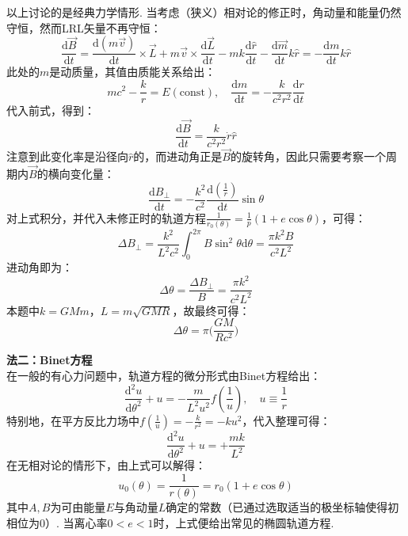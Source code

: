 \documentclass{ctexart}
\begin{document}
以上讨论的是经典力学情形. 当考虑（狭义）相对论的修正时，角动量和能量仍然守恒，然而LRL矢量不再守恒：
\begin{equation}
  \frac{\mathrm{d}\vec{B}}{\mathrm{d}t}=
  \frac{\mathrm{d}(m\vec{v})}{\mathrm{d}t}\times \vec{L}+m\vec{v}\times \frac{\mathrm{d}\vec{L}}{\mathrm{d}t}-mk\frac{\mathrm{d}\hat{r}}{\mathrm{d}t}-\frac{\mathrm{d}\vec{m}}{\mathrm{d}t}k\hat{r}
  =-\frac{\mathrm{d}m}{\mathrm{d}t}k\hat{r} \tag{7.15}
\end{equation}
此处的$m$是动质量，其值由质能关系给出：
\begin{equation}
  mc^2-\frac{k}{r}=E(\mathrm{const}),\quad \frac{\mathrm{d}m}{\mathrm{d}t}=-\frac{k}{c^2 r^2}\frac{\mathrm{d}r}{\mathrm{d}t} \tag{7.16}
\end{equation}
代入前式，得到：
\begin{equation}
  \frac{\mathrm{d}\vec{B}}{\mathrm{d}t}=\frac{k}{c^2 r^2}\dot{r}\hat{r} \tag{7.17}
\end{equation}
注意到此变化率是沿径向$\hat{r}$的，而进动角正是$\vec{B}$的旋转角，因此只需要考察一个周期内$\vec{B}$的横向变化量：
\begin{equation}
\frac{\text{d}B_\bot}{\text{d}t}=-\frac{k^2}{c^2}\frac{\text{d}(\frac{1}{r})}{\text{d}t}\sin{\theta}\tag{7.18}
\end{equation}
对上式积分，并代入未修正时的轨道方程$\displaystyle\frac{1}{r_0(\theta)}=\frac{1}{p}(1+e\cos{\theta})$，可得：
\begin{equation}
\Delta{B_\bot}=\frac{k^2}{L^2c^2}\int_0^{2\pi}B\sin^2{\theta}\text{d}\theta=\frac{{\pi}k^2B}{c^2L^2}\tag{7.19}
\end{equation}
进动角即为：
\begin{equation}
\Delta{\theta}=\frac{\Delta{B_\bot}}{B}=\frac{{\pi}k^2}{c^2L^2} \tag{7.20}
\end{equation}
本题中$k=GMm$，$L=m\sqrt{GMR}$，故最终可得：
\begin{equation}
\Delta{\theta}=\pi \Big(\frac{GM}{Rc^2}\Big) \tag{7.21}
\end{equation}

\noindent \textbf{法二：Binet方程}\\
在一般的有心力问题中，轨道方程的微分形式由Binet方程给出：
\begin{equation}
\displaystyle \frac{\text{d}^2u}{\text{d}\theta^2}+u=-\frac{m}{L^2u^2}f(\frac{1}{u}),\quad u\equiv \frac{1}{r}\tag{7.22}
\end{equation}
特别地，在平方反比力场中$\displaystyle f(\frac{1}{u})=-\frac{k}{r^2}=-ku^2$，代入整理可得：
\begin{equation}
\displaystyle \frac{\text{d}^2u}{\text{d}\theta^2}+u=+\frac{mk}{L^2} \tag{7.23}
\end{equation}
在无相对论的情形下，由上式可以解得：
\begin{equation}
u_0(\theta)=\frac{1}{r(\theta)}=r_0(1+e\cos\theta)
\tag{7.24}
\end{equation}
其中$A,B$为可由能量$E$与角动量$L$确定的常数（已通过选取适当的极坐标轴使得初相位为0）. 当离心率$0<e<1$时，上式便给出常见的椭圆轨道方程.
\end{document}
